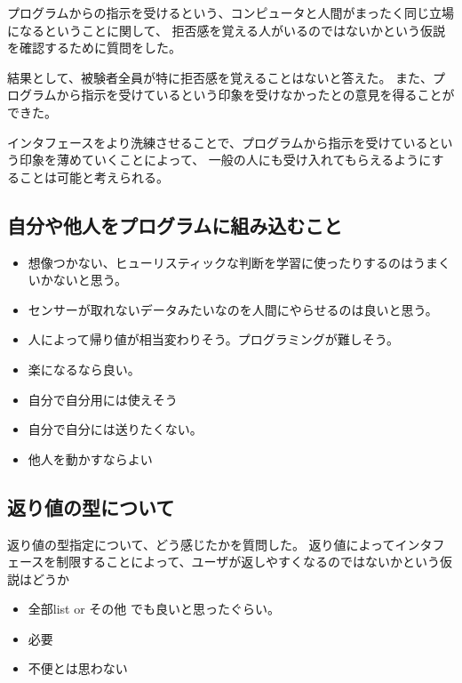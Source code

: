 プログラムからの指示を受けるという、コンピュータと人間がまったく同じ立場になるということに関して、
拒否感を覚える人がいるのではないかという仮説を確認するために質問をした。

結果として、被験者全員が特に拒否感を覚えることはないと答えた。
また、プログラムから指示を受けているという印象を受けなかったとの意見を得ることができた。

インタフェースをより洗練させることで、プログラムから指示を受けているという印象を薄めていくことによって、
一般の人にも受け入れてもらえるようにすることは可能と考えられる。

\subsection{自分や他人をプログラムに組み込むこと}\label{ux81eaux5206ux3084ux4ed6ux4ebaux3092ux30d7ux30edux30b0ux30e9ux30e0ux306bux7d44ux307fux8fbcux3080ux3053ux3068}

\begin{itemize}
\item
  想像つかない、ヒューリスティックな判断を学習に使ったりするのはうまくいかないと思う。
\item
  センサーが取れないデータみたいなのを人間にやらせるのは良いと思う。
\item
  人によって帰り値が相当変わりそう。プログラミングが難しそう。
\item
  楽になるなら良い。
\item
  自分で自分用には使えそう
\item
  自分で自分には送りたくない。
\item
  他人を動かすならよい
\end{itemize}

\subsection{返り値の型について}\label{ux8fd4ux308aux5024ux306eux578bux306bux3064ux3044ux3066}

返り値の型指定について、どう感じたかを質問した。
返り値によってインタフェースを制限することによって、ユーザが返しやすくなるのではないかという仮説はどうか

\begin{itemize}
\itemsep1pt\parskip0pt
\item
  全部list or その他 でも良いと思ったぐらい。
\item
  必要
\item
  不便とは思わない
\end{itemize}

